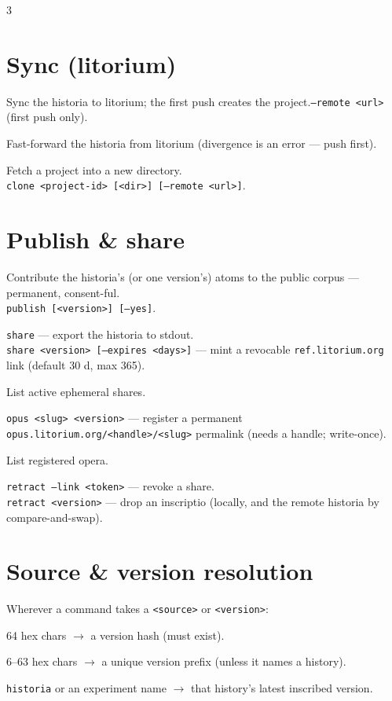 \documentclass[9pt]{extarticle}
\newcommand{\ci}[1]{\texttt{#1}}                       %
\newcommand{\opt}[1]{\textcolor{faint}{\texttt{#1}}}   %
\newcommand{\entry}[2]{\needspace{2\baselineskip}\item[\ci{\textbf{#1}}]#2}
\begin{document}
\begin{multicols}{3}
\section{Sync (litorium)}
\begin{description}
\entry{push}{Sync the historia to litorium; the first push
creates the project.\quad\opt{--remote <url>} (first push
only).}
\entry{pull}{Fast-forward the historia from litorium (divergence
is an error — push first).}
\entry{clone}{Fetch a project into a new directory.\\
\ci{clone <project-id> [<dir>] [--remote <url>]}.}
\end{description}

\section{Publish \& share}
\begin{description}
\entry{publish}{Contribute the historia's (or one version's)
atoms to the public corpus — permanent, consent-ful.\\
\ci{publish [<version>] [--yes]}.}
\entry{share}{\ci{share} — export the historia to stdout.\\
\ci{share <version> [--expires <days>]} — mint a revocable
\ci{ref.litorium.org} link (default 30 d, max 365).}
\entry{shares}{List active ephemeral shares.}
\entry{opus}{\ci{opus <slug> <version>} — register a permanent
\ci{opus.litorium.org/<handle>/<slug>} permalink (needs a
handle; write-once).}
\entry{opera}{List registered opera.}
\entry{retract}{\ci{retract --link <token>} — revoke a share.\\
\ci{retract <version>} — drop an inscriptio (locally, and the
remote historia by compare-and-swap).}
\end{description}

\section{Source \& version resolution}
Wherever a command takes a \ci{<source>} or \ci{<version>}:
\begin{description}[leftmargin=1em,labelsep=0.4em]
\item[$\cdot$] 64 hex chars $\rightarrow$ a version hash (must
exist).
\item[$\cdot$] 6–63 hex chars $\rightarrow$ a unique version
prefix (unless it names a history).
\item[$\cdot$] \ci{historia} or an experiment name
$\rightarrow$ that history's latest inscribed version.
\end{description}


\end{multicols}
\end{document}
